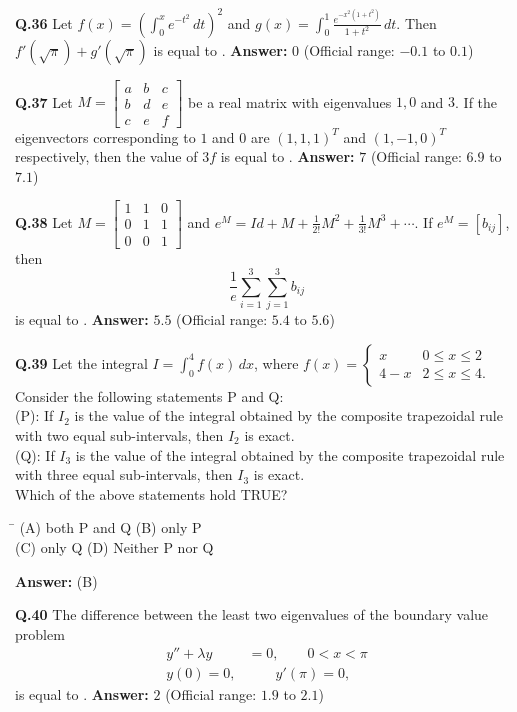 \documentclass[11pt,a4paper]{article}
\newcommand{\optsfourA}[4]{%
  \begin{tabbing}
    \hspace{0.48\linewidth}\=\kill
    (A) #1 \> (B) #2 \\[2pt]
    (C) #3 \> (D) #4
  \end{tabbing}%
}
\newcommand{\ans}[1]{\textbf{Answer:} #1\par\medskip}
\begin{document}
\textbf{Q.36} Let $f(x) = \left(\int_0^x e^{-t^2}\,dt\right)^2$ and $g(x) = \int_0^1 \frac{e^{-x^2(1 + t^2)}}{1 + t^2}\,dt$. Then $f'(\sqrt{\pi}) + g'(\sqrt{\pi})$ is equal to \underline{\hspace{2cm}}.
\ans{$0$ (Official range: $-0.1$ to $0.1$)}

\textbf{Q.37} Let $M = \begin{bmatrix} a & b & c \\ b & d & e \\ c & e & f \end{bmatrix}$ be a real matrix with eigenvalues $1, 0$ and $3$. If the eigenvectors corresponding to $1$ and $0$ are $(1, 1, 1)^T$ and $(1, -1, 0)^T$ respectively, then the value of $3f$ is equal to \underline{\hspace{2cm}}.
\ans{$7$ (Official range: $6.9$ to $7.1$)}

\textbf{Q.38} Let $M = \begin{bmatrix} 1 & 1 & 0 \\ 0 & 1 & 1 \\ 0 & 0 & 1 \end{bmatrix}$ and $e^M = Id + M + \frac{1}{2!}M^2 + \frac{1}{3!}M^3 + \cdots$. If $e^M = [b_{ij}]$, then
\[
  \frac{1}{e} \sum_{i=1}^{3} \sum_{j=1}^{3} b_{ij}
\]
is equal to \underline{\hspace{2cm}}.
\ans{$5.5$ (Official range: $5.4$ to $5.6$)}

\textbf{Q.39} Let the integral $I = \int_0^4 f(x)\,dx$, where $f(x) = \begin{cases} x & 0 \le x \le 2 \\ 4 - x & 2 \le x \le 4. \end{cases}$\\
Consider the following statements P and Q:\\
(P): If $I_2$ is the value of the integral obtained by the composite trapezoidal rule with two equal sub-intervals, then $I_2$ is exact.\\
(Q): If $I_3$ is the value of the integral obtained by the composite trapezoidal rule with three equal sub-intervals, then $I_3$ is exact.\\
Which of the above statements hold TRUE?
\optsfourA{both P and Q}{only P}{only Q}{Neither P nor Q}
\ans{(B)}

\textbf{Q.40} The difference between the least two eigenvalues of the boundary value problem
\begin{align*}
  y'' + \lambda y &= 0, \qquad 0 < x < \pi \\
  y(0) = 0, &\qquad y'(\pi) = 0,
\end{align*}
is equal to \underline{\hspace{2cm}}.
\ans{$2$ (Official range: $1.9$ to $2.1$)}
\end{document}
